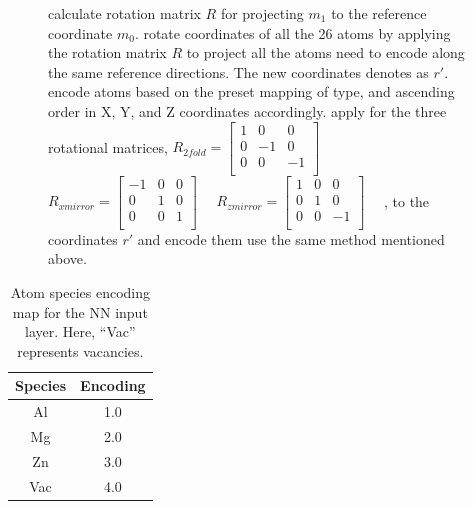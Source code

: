 \begin{figure}[!htb]
\begin{minipage}{.7\linewidth}
\begin{algorithm}[H]
\begin{algorithmic}[1]
        \State calculate rotation matrix $R$ for projecting $m_1$ to the reference coordinate $m_0$. 
        \State rotate coordinates of all the 26 atoms by applying the rotation matrix $R$ to project all the atoms need to encode along the same reference directions. The new coordinates denotes as $r'$. 
        \State encode atoms based on the preset mapping of type, and ascending order in X, Y, and Z coordinates accordingly.
        \State apply for the three rotational matrices, 
        $R_{2 fold} = \begin{bmatrix} 1 & 0 & 0 \\
                                      0 & -1 & 0 \\
                                      0 & 0 & -1 \\
        \end{bmatrix}\quad$
        $R_{x mirror} = \begin{bmatrix} -1 & 0 & 0 \\
                                         0 & 1 & 0 \\
                                         0 & 0 & 1 \\
        \end{bmatrix}\quad$
        $R_{z mirror} = \begin{bmatrix} 1 & 0 & 0 \\
                                        0 & 1 & 0 \\
                                        0 & 0 & -1 \\
        \end{bmatrix}\quad$
        , to the coordinates $r'$ and encode them use the same method mentioned above.
        
      \end{algorithmic}
    \end{algorithm}
  \end{minipage}
\end{figure}


\begin{table}[!htbp]
\centering
\caption[Atom species encoding map for the \acf{NN} input layer.]{Atom species encoding map for the \acf{NN} input layer. Here, ``Vac'' represents vacancies.}
\label{Chap:Al/Vac:tab:mapping}
\begin{tabular}{cc}
\\
\hline
\hline
Species & Encoding  \\ \hline
Al & 1.0 \\
Mg & 2.0 \\
Zn & 3.0 \\
Vac & 4.0 \\
\hline
\hline
\end{tabular}
\end{table}


